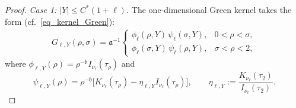 \documentclass[10pt,a4paper]{amsart}
\begin{document}
\begin{proof}
\textit{Case 1: $|Y|\le C^*(1+\ell)$.} 
The one-dimensional Green kernel takes the form (cf.~\eqref{eq_kernel_Green}):
\begin{align}\label{eq_kernel_Green_copy}
G_{\ell,Y}(\rho,\sigma) = \mathfrak a^{-1}
\begin{cases}
\phi_{\ell}(\rho,Y)\,\psi_{\ell}(\sigma,Y), &0<\rho<\sigma,\\[4pt]
\phi_{\ell}(\sigma,Y)\,\psi_{\ell}(\rho,Y), &\sigma < \rho<2,
\end{cases}
\end{align}
where $\phi_{\ell,Y}(\rho) = \rho^{-\mathfrak b}I_{\nu_\ell}(\tau_\rho)$ and
\begin{equation*}
\psi_{\ell,Y}(\rho) = \rho^{-\mathfrak b} \bigl[ K_{\nu_\ell}(\tau_\rho) - \eta_{\ell,Y} I_{\nu_\ell}(\tau_\rho)\bigr],\qquad \eta_{\ell,Y} := \frac{K_{\nu_\ell}(\tau_2)}{I_{\nu_\ell}(\tau_2)}.
\end{equation*}



\end{proof}
\end{document}
